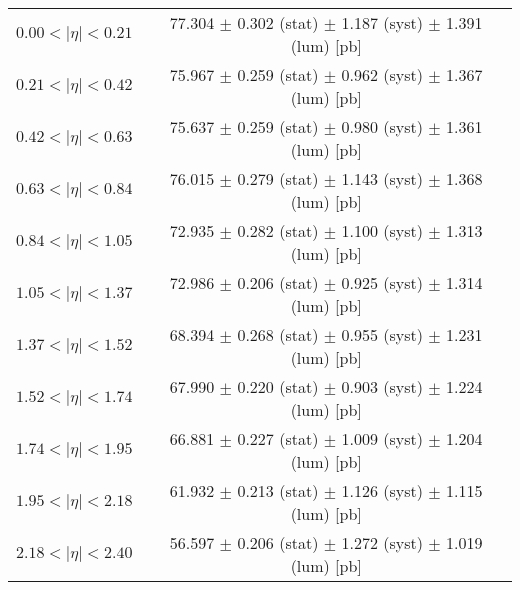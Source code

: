 \begin{tabular}{lc}
\hline
$0.00 < |\eta| <0.21$          & 77.304 $\pm$ 0.302 (stat) $\pm$ 1.187 (syst) $\pm$ 1.391 (lum) [pb]  \\
$0.21 < |\eta| <0.42$          & 75.967 $\pm$ 0.259 (stat) $\pm$ 0.962 (syst) $\pm$ 1.367 (lum) [pb]  \\
$0.42 < |\eta| <0.63$          & 75.637 $\pm$ 0.259 (stat) $\pm$ 0.980 (syst) $\pm$ 1.361 (lum) [pb]  \\
$0.63 < |\eta| <0.84$          & 76.015 $\pm$ 0.279 (stat) $\pm$ 1.143 (syst) $\pm$ 1.368 (lum) [pb]  \\
$0.84 < |\eta| <1.05$          & 72.935 $\pm$ 0.282 (stat) $\pm$ 1.100 (syst) $\pm$ 1.313 (lum) [pb]  \\
$1.05 < |\eta| <1.37$          & 72.986 $\pm$ 0.206 (stat) $\pm$ 0.925 (syst) $\pm$ 1.314 (lum) [pb]  \\
$1.37 < |\eta| <1.52$          & 68.394 $\pm$ 0.268 (stat) $\pm$ 0.955 (syst) $\pm$ 1.231 (lum) [pb]  \\
$1.52 < |\eta| <1.74$          & 67.990 $\pm$ 0.220 (stat) $\pm$ 0.903 (syst) $\pm$ 1.224 (lum) [pb]  \\
$1.74 < |\eta| <1.95$          & 66.881 $\pm$ 0.227 (stat) $\pm$ 1.009 (syst) $\pm$ 1.204 (lum) [pb]  \\
$1.95 < |\eta| <2.18$          & 61.932 $\pm$ 0.213 (stat) $\pm$ 1.126 (syst) $\pm$ 1.115 (lum) [pb]  \\
$2.18 < |\eta| <2.40$          & 56.597 $\pm$ 0.206 (stat) $\pm$ 1.272 (syst) $\pm$ 1.019 (lum) [pb]  \\
\hline
\end{tabular}
